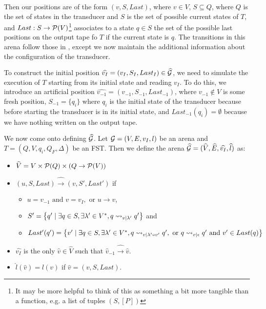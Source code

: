 \documentclass[10pt, a4paper]{report}
\begin{document}
Then our positions are of the form $(v, S, Last)$, where $v \in V$, $S \subseteq
Q$, where $Q$ is the set of states in the transducer and $S$ is the set of
possible current states of $T$, and $Last : S \rightarrow \mathcal{P}(V)$\footnote{It may be
  more helpful to think of this as something a bit more tangible than a
  function, e.g. a list of tuples $(S, [P])$} associates to a state $q \in S$
the set of the possible last positions on the output tape fo $T$ if the current
state is $q$. The transitions in this arena follow those in , except we
now maintain the additional information about the configuration of the
transducer.

To construct the initial position $\widehat{v_I} = (v_I, S_I, Last_I) \in
\widehat{\mathcal{G}}$, we need to simulate the execution of $T$ starting from its
initial state and reading $v_I$. To do this, we introduce an artificial position
$\widehat{v_{-1}} = (v_{-1}, S_{-1}, Last_{-1})$, where $v_{-1} \not \in V$ is
some fresh position, $S_{-1} = \{q_i\}$ where $q_i$ is the initial state of the
transducer because before starting the transducer is in its initial state, and
$Last_{-1} (q_i) = \emptyset$ because we have nothing written on the output
tape.  

We now come onto defining $\widehat{\mathcal{G}}$. Let $\mathcal{G} = (V, E, v_I, l)$ be an arena and
$T = (Q, V, q_i, Q_F, \Delta)$ be an FST. Then we define the arena
$\widehat{\mathcal{G}} = (\widehat{V}, \widehat{E}, \widehat{v_I}, \widehat{l})$ as:

\begin{itemize}
\item $\widehat{V} = V \times \mathcal{P}(Q) \times (Q \rightarrow \mathcal{P}(V))$
\item $(u, S, Last) \widehat{\rightarrow} (v, S', Last')$ if
  \begin{itemize}
  \item $u = v_{-1} \text{ and } v = v_I, \text{ or } u \rightarrow v$,
  \item $S' = \left\{q' \mid \exists q \in S, \exists \lambda' \in V^\ast, q
      \rightsquigarrow_{v \mid \lambda'} q' \right\}$ and
  \item $Last' (q') = \left\{ v' \mid \exists q \in S, \exists \lambda' \in
      V^\ast, q \rightsquigarrow_{v \mid \lambda' \circ v'} q', \text{ or } q \rightsquigarrow_{v \mid
        \epsilon} q' \text{ and } v' \in Last(q) \right\}$
  \end{itemize}
\item $\widehat{v_I}$ is the only $\widehat{v} \in \widehat{V}$ such that
  $\widehat{v}_{-1} \widehat{\rightarrow} \widehat{v}$.
\item $\widehat{l}(\widehat{v}) = l (v)$ if $\widehat{v}= (v, S, Last)$. 
\end{itemize}
\end{document}
